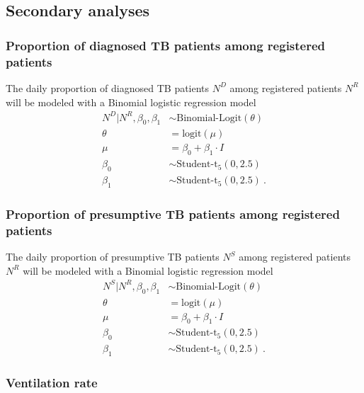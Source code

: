 \documentclass{article}
\begin{document}
\subsection{Secondary analyses}

\subsubsection{Proportion of diagnosed TB patients among registered patients}

The daily proportion of diagnosed TB patients $N^D$ among registered patients $N^R$ will be modeled with a Binomial logistic regression model
\begin{align*}
    N^D | N^R, \beta_0, \beta_1 &\sim \text{Binomial-Logit}(\theta) \\
    \theta &= \text{logit}(\mu) \\
    \mu &= \beta_0 + \beta_1 \cdot I \\
    \beta_0 &\sim \text{Student-t}_5(0, 2.5) \\
    \beta_1 &\sim \text{Student-t}_5\left(0, 2.5\right)~.
\end{align*}

\subsubsection{Proportion of presumptive TB patients among registered patients}

The daily proportion of presumptive TB patients $N^S$ among registered patients $N^R$ will be modeled with a Binomial logistic regression model
\begin{align*}
    N^S | N^R, \beta_0, \beta_1 &\sim \text{Binomial-Logit}(\theta) \\
    \theta &= \text{logit}(\mu) \\
    \mu &= \beta_0 + \beta_1 \cdot I \\
    \beta_0 &\sim \text{Student-t}_5(0, 2.5) \\
    \beta_1 &\sim \text{Student-t}_5\left(0, 2.5\right)~.
\end{align*}

\subsubsection{Ventilation rate}
\end{document}
